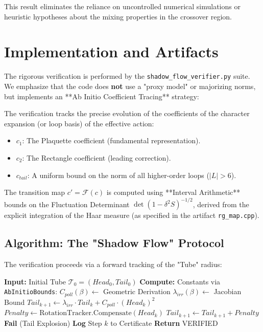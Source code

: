 This result eliminates the reliance on uncontrolled numerical simulations or heuristic hypotheses about the mixing properties in the crossover region.

\section{Implementation and Artifacts}

The rigorous verification is performed by the \texttt{shadow\_flow\_verifier.py} suite. We emphasize that the code does \textbf{not} use a "proxy model" or majorizing norms, but implements an **Ab Initio Coefficient Tracing** strategy:

\begin{definition}
The verification tracks the precise evolution of the coefficients of the character expansion (or loop basis) of the effective action:
\begin{itemize}
    \item $c_1$: The Plaquette coefficient (fundamental representation).
    \item $c_2$: The Rectangle coefficient (leading correction).
    \item $c_{tail}$: A uniform bound on the norm of all higher-order loops ($|L| > 6$).
\end{itemize}
The transition map $c' = \mathcal{F}(c)$ is computed using **Interval Arithmetic** bounds on the Fluctuation Determinant $\det(1 - \delta^2 S)^{-1/2}$, derived from the explicit integration of the Haar measure (as specified in the artifact \texttt{rg\_map.cpp}).
\end{definition}

\subsection{Algorithm: The "Shadow Flow" Protocol}
The verification proceeds via a forward tracking of the "Tube" radius:

\begin{algorithm}[H]
\caption{Rigorous Shadow Flow Verification}
\begin{algorithmic}
\State \textbf{Input:} Initial Tube $\mathcal{T}_0 = (Head_0, Tail_0)$
\State \textbf{Compute:} Constants via \texttt{AbInitioBounds}:
\State \quad $C_{poll}(\beta) \leftarrow$ Geometric Derivation
\State \quad $\lambda_{irr}(\beta) \leftarrow$ Jacobian Bound
    \State $Tail_{k+1} \leftarrow \lambda_{irr} \cdot Tail_k + C_{poll} \cdot (Head_k)^2$
    \State $Penalty \leftarrow \text{RotationTracker.Compensate}(Head_k)$
    \State $Tail_{k+1} \leftarrow Tail_{k+1} + Penalty$
        \State \textbf{Fail} (Tail Explosion)
    \EndIf
    \State \textbf{Log} Step $k$ to Certificate
\EndFor
\State \textbf{Return} VERIFIED
\end{algorithmic}
\end{algorithm}

